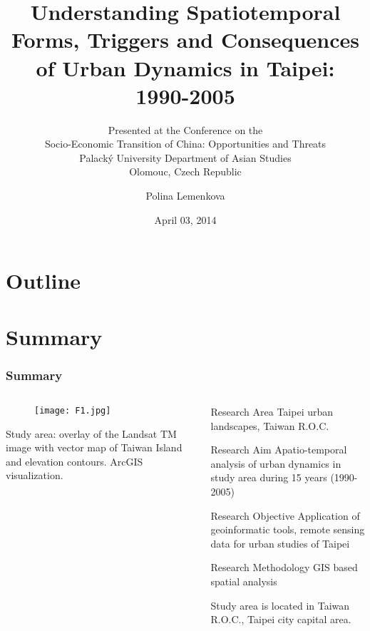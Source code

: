 \documentclass[pdflatex,compress,8pt,
	xcolor={dvipsnames,dvipsnames,svgnames,x11names,table},
	hyperref={colorlinks = true,breaklinks = true, urlcolor = NavyBlue, breaklinks = true}]{beamer}
\title[Understanding Spatiotemporal Forms, Triggers and Consequences of Urban Dynamics in Taipei: 1990-2005]{Understanding Spatiotemporal Forms, Triggers and Consequences of Urban Dynamics in Taipei: 1990-2005}
\subtitle{\vspace*{0.5cm}Presented at the Conference on the \\
Socio-Economic Transition of China: Opportunities and Threats \\
Palack\'{y} University Department of Asian Studies \\
Olomouc, Czech Republic}
\author{Polina Lemenkova}
\date{April 03, 2014}
\begin{document}
\begin{frame}
           \titlepage
\end{frame}

\section*{Outline}
\begin{frame}
           \tableofcontents
\end{frame}

\section{Summary}

\begin{frame}\frametitle{Summary}
\begin{minipage}[0.4\textheight]{\textwidth}
\begin{columns}[T]
\begin{column}{0.5\textwidth}
\begin{figure}[H]
	\centering
		\texttt{[image: F1.jpg]}
\end{figure}
\small{Study area: overlay of the Landsat TM image with vector map of Taiwan Island and elevation contours. ArcGIS visualization.}
\end{column}
\begin{column}{0.5\textwidth}
\begin{alertblock}{Research Area}
Taipei urban landscapes, Taiwan R.O.C.
\end{alertblock}

\begin{block}{Research Aim}
Apatio-temporal analysis of urban dynamics in study area during 15 years (1990-2005)
\end{block}

\begin{alertblock}{Research Objective}
Application of geoinformatic tools, remote sensing data for urban studies of Taipei
\end{alertblock}

\begin{block}{Research Methodology}
GIS based spatial analysis
\end{block}

Study area is located in Taiwan R.O.C., Taipei city capital area. 
\end{column}
\end{columns}
\end{minipage}
\end{frame}
\end{document}
